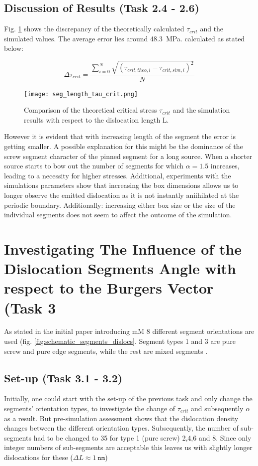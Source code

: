 \subsection{Discussion of Results (Task 2.4 - 2.6)}
Fig. \ref{fig:tau_crit_theo_vs_sim} shows the discrepancy of the theoretically calculated \(\tau_{crit}\) and the simulated values. The average error lies around 48.3~MPa. calculated as stated below:

\begin{equation}
	\Delta \tau_{crit} = \frac{\sum_{i=0}^{N} \sqrt{(\tau_{crit,theo,i} - \tau_{crit,sim,i})^{2}}}{N} 
\end{equation}

\begin{figure}[htb]
	\centering
	\texttt{[image: seg\_length\_tau\_crit.png]}
	\caption{Comparison of the theoretical critical stress \(\tau_{crit}\) and the simulation results with respect to the dislocation length L.}
	\label{fig:tau_crit_theo_vs_sim}
\end{figure}

However it is evident that with increasing length of the segment the error is getting smaller. A possible explanation for this might be the dominance of the screw segment character of the pinned segment for a long source. When a shorter source starts to bow out the number of segments for which \(\alpha = 1.5\) increases, leading to a necessity for higher stresses. Additional, experiments with the simulations parameters show that increasing the box dimensions allows us to longer observe the emitted dislocation as it is not instantly aniihilated at the periodic boundary. Additionally: increasing either box size or the size of the individual segments does not seem to affect the outcome of the simulation.

\section{Investigating The Influence of the Dislocation Segments Angle with respect to the Burgers Vector (Task 3}

As stated in the initial paper introducing mM 8 different segment orientations are used (fig. \ref{fig:schematic_segments_dislocs}. Segment types 1 and 3 are pure screw and pure edge segments, while the rest are mixed segments \cite{devincre2011}.

\subsection{Set-up (Task 3.1 - 3.2)}
Initially, one could start with the set-up of the previous task and only change the segments' orientation types, to investigate the change of \(\tau_{crit}\) and subsequently \(\alpha\) as a result.
But pre-simulation assessment shows that the dislocation density changes between the different orientation types. Subsequently, the number of sub-segments had to be changed to 35 for type 1 (pure screw) 2,4,6 and 8. Since only integer numbers of sub-segments are acceptable this leaves us with slightly longer dislocations for these (\( \Delta L \approx 1~\mathtt{nm}\))  

